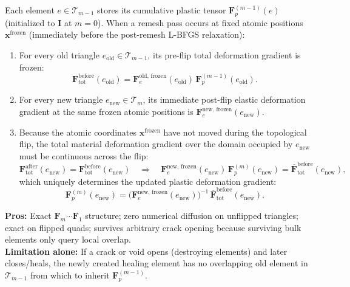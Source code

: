 \documentclass[11pt,a4paper]{article}
\begin{document}
Each element $e \in \mathcal{T}_{m-1}$ stores its cumulative plastic tensor $\mathbf{F}_p^{(m-1)}(e)$ (initialized to $\mathbf{I}$ at $m=0$). When a remesh pass occurs at fixed atomic positions $\mathbf{x}^{\text{frozen}}$ (immediately before the post-remesh L-BFGS relaxation):
\begin{enumerate}[nosep]
  \item For every old triangle $e_{\text{old}} \in \mathcal{T}_{m-1}$, its pre-flip total deformation gradient is frozen:
    \begin{equation}
      \mathbf{F}_{\text{tot}}^{\text{before}}(e_{\text{old}}) = \mathbf{F}_e^{\text{old, frozen}}(e_{\text{old}}) \, \mathbf{F}_p^{(m-1)}(e_{\text{old}}).
    \end{equation}
  \item For every new triangle $e_{\text{new}} \in \mathcal{T}_m$, its immediate post-flip elastic deformation gradient at the same frozen atomic positions is $\mathbf{F}_e^{\text{new, frozen}}(e_{\text{new}})$.
  \item Because the atomic coordinates $\mathbf{x}^{\text{frozen}}$ have not moved during the topological flip, the total material deformation gradient over the domain occupied by $e_{\text{new}}$ must be continuous across the flip:
    \begin{equation}
      \mathbf{F}_{\text{tot}}^{\text{after}}(e_{\text{new}}) = \mathbf{F}_{\text{tot}}^{\text{before}}(e_{\text{new}})
      \quad\Longrightarrow\quad
      \mathbf{F}_e^{\text{new, frozen}}(e_{\text{new}}) \, \mathbf{F}_p^{(m)}(e_{\text{new}}) = \overline{\mathbf{F}}_{\text{tot}}^{\text{before}}(e_{\text{new}}),
    \end{equation}
    which uniquely determines the updated plastic deformation gradient:
    \begin{equation}
      \boxed{\mathbf{F}_p^{(m)}(e_{\text{new}}) = \bigl(\mathbf{F}_e^{\text{new, frozen}}(e_{\text{new}})\bigr)^{-1} \, \overline{\mathbf{F}}_{\text{tot}}^{\text{before}}(e_{\text{new}}).}
      \label{eq:Fp_update}
    \end{equation}
\end{enumerate}
\textbf{Pros:} Exact $\mathbf{F}_m \cdots \mathbf{F}_1$ structure; zero numerical diffusion on unflipped triangles; exact on flipped quads; survives arbitrary crack opening because surviving bulk elements only query local overlap. \\
\textbf{Limitation alone:} If a crack or void opens (destroying elements) and later closes/heals, the newly created healing element has no overlapping old element in $\mathcal{T}_{m-1}$ from which to inherit $\mathbf{F}_p^{(m-1)}$.
\end{document}
